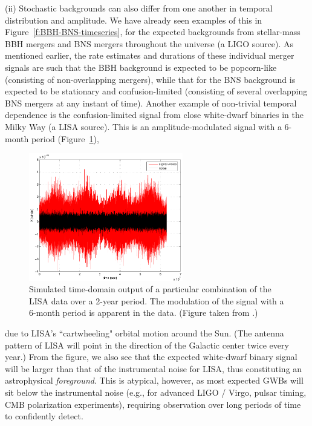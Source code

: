 (ii) Stochastic backgrounds can also differ from one 
another in temporal distribution and amplitude.
We have already seen examples of this in 
Figure~\ref{f:BBH-BNS-timeseries}, for the expected
backgrounds from stellar-mass BBH mergers and 
BNS mergers throughout the universe (a LIGO source).
As mentioned earlier, the rate estimates and 
durations of these individual merger signals are such 
that the BBH background is expected to be popcorn-like 
(consisting of non-overlapping mergers), 
while that for the BNS background is expected to be
stationary and confusion-limited 
(consisting of several overlapping BNS mergers at any
instant of time).
Another example of non-trivial temporal dependence
is the confusion-limited signal from close 
white-dwarf binaries in the Milky Way (a LISA source).
This is an amplitude-modulated signal with 
a 6-month period (Figure~\ref{f:cyclostationary_data}), 
%
\begin{figure}[htbp!]
\begin{center}
\includegraphics[width=0.6\textwidth]{Figures/cyclostationary_data}
\caption{Simulated time-domain output of a particular 
combination of the LISA data over a 2-year period.
The modulation of the signal with a 6-month period
is apparent in the data.
(Figure taken from \cite{Romano-Cornish:2017}.)}
\label{f:cyclostationary_data}
\end{center}
\end{figure}
%
due to LISA's ``cartwheeling" orbital motion around 
the Sun.
(The antenna pattern of LISA will point in the direction
of the Galactic center twice every year.) 
From the figure, we also see that the expected 
white-dwarf binary signal will be larger than that 
of the instrumental noise for LISA, thus constituting 
an astrophysical {\em foreground}.
This is atypical, however, as most expected GWBs will sit 
below the instrumental noise (e.g., for advanced LIGO / Virgo,
pulsar timing, CMB polarization experiments), requiring 
observation over long periods of time to confidently detect.

